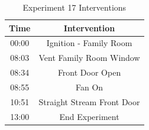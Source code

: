 \documentclass{article}
\begin{document}
\begin{table}[H]
	\centering
	\caption{Experiment 17 Interventions}
	\begin{tabular}{|c|c|} 
		\hline
		Time & Intervention \\ \hline \hline
		00:00 & Ignition - Family Room \\ \hline
		08:03 & Vent Family Room Window\\ \hline
		08:34 & Front Door Open \\ \hline
		08:55 & Fan On \\ \hline
		10:51 & Straight Stream Front Door \\ \hline
		13:00 & End Experiment \\ \hline
	\end{tabular}
	\label{Table:Exp17Interventions}
\end{table}
\end{document}
